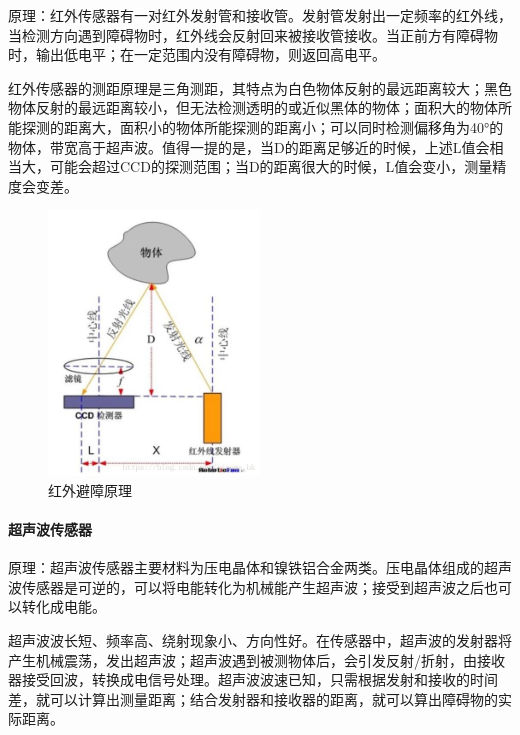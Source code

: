 \documentclass{report}
\begin{document}
原理：红外传感器有一对红外发射管和接收管。发射管发射出一定频率的红外线，当检测方向遇到障碍物时，红外线会反射回来被接收管接收。当正前方有障碍物时，输出低电平；在一定范围内没有障碍物，则返回高电平。

红外传感器的测距原理是三角测距，其特点为白色物体反射的最远距离较大；黑色物体反射的最远距离较小，但无法检测透明的或近似黑体的物体；面积大的物体所能探测的距离大，面积小的物体所能探测的距离小；可以同时检测偏移角为40°的物体，带宽高于超声波。值得一提的是，当D的距离足够近的时候，上述L值会相当大，可能会超过CCD的探测范围；当D的距离很大的时候，L值会变小，测量精度会变差\cite{jh1}。
  \begin{figure}[ht]
    \centering
    \includegraphics[width=0.5\textwidth]{figures/hongwaibizhang.png}
    \caption{红外避障原理 }
  \end{figure}
\newpage
  \paragraph{超声波传感器}
  
原理：超声波传感器主要材料为压电晶体和镍铁铝合金两类。压电晶体组成的超声波传感器是可逆的，可以将电能转化为机械能产生超声波；接受到超声波之后也可以转化成电能。

超声波波长短、频率高、绕射现象小、方向性好。在传感器中，超声波的发射器将产生机械震荡，发出超声波；超声波遇到被测物体后，会引发反射/折射，由接收器接受回波，转换成电信号处理。超声波波速已知，只需根据发射和接收的时间差，就可以计算出测量距离；结合发射器和接收器的距离，就可以算出障碍物的实际距离。
\end{document}
